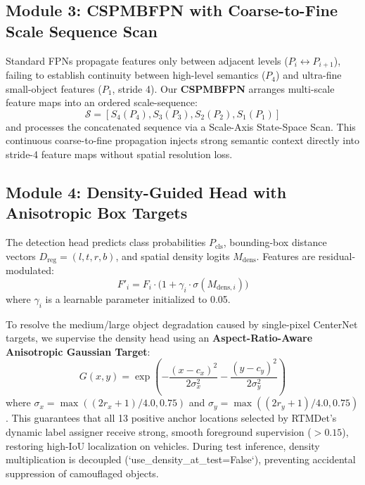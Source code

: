 \documentclass[12pt,a4paper]{report}
\begin{document}
\subsection{Module 3: CSPMBFPN with Coarse-to-Fine Scale Sequence Scan}
Standard FPNs propagate features only between adjacent levels ($P_i \leftrightarrow P_{i+1}$), failing to establish continuity between high-level semantics ($P_4$) and ultra-fine small-object features ($P_1$, stride 4). Our \textbf{CSPMBFPN} arranges multi-scale feature maps into an ordered scale-sequence:
\begin{equation}
    \mathcal{S} = [S_4(P_4), S_3(P_3), S_2(P_2), S_1(P_1)]
\end{equation}
and processes the concatenated sequence via a Scale-Axis State-Space Scan. This continuous coarse-to-fine propagation injects strong semantic context directly into stride-4 feature maps without spatial resolution loss.

\subsection{Module 4: Density-Guided Head with Anisotropic Box Targets}
The detection head predicts class probabilities $P_{\text{cls}}$, bounding-box distance vectors $D_{\text{reg}} = (l, t, r, b)$, and spatial density logits $M_{\text{dens}}$. Features are residual-modulated:
\begin{equation}
    F'_i = F_i \cdot \big(1 + \gamma_i \cdot \sigma(M_{\text{dens}, i})\big)
\end{equation}
where $\gamma_i$ is a learnable parameter initialized to 0.05. 

To resolve the medium/large object degradation caused by single-pixel CenterNet targets, we supervise the density head using an \textbf{Aspect-Ratio-Aware Anisotropic Gaussian Target}:
\begin{equation}
    G(x, y) = \exp\left( - \frac{(x - c_x)^2}{2 \sigma_x^2} - \frac{(y - c_y)^2}{2 \sigma_y^2} \right)
\end{equation}
where $\sigma_x = \max((2r_x + 1)/4.0, 0.75)$ and $\sigma_y = \max((2r_y + 1)/4.0, 0.75)$. This guarantees that all 13 positive anchor locations selected by RTMDet's dynamic label assigner receive strong, smooth foreground supervision ($>0.15$), restoring high-IoU localization on vehicles. During test inference, density multiplication is decoupled (`use_density_at_test=False`), preventing accidental suppression of camouflaged objects.
\end{document}
